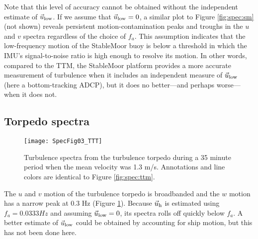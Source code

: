 Note that this level of accuracy cannot be obtained without the independent estimate of $\vec{u}_\mathrm{low}$. If we assume that $\vec{u}_\mathrm{low}=0$, a similar plot to Figure \ref{fig:spec:sm} (not shown) reveals persistent motion-contamination peaks and troughs in the $u$ and $v$ spectra regardless of the choice of $f_a$. This assumption indicates that the low-frequency motion of the StableMoor buoy is below a threshold in which the IMU's signal-to-noise ratio is high enough to resolve its motion. In other words, compared to the TTM, the StableMoor platform provides a more accurate measurement of turbulence when it includes an independent measure of $\vec{u}_\mathrm{low}$ (here a bottom-tracking ADCP), but it does no better---and perhaps worse---when it does not.
%
%


\subsection{Torpedo spectra}

\begin{figure}[t]
  \centering
  \texttt{[image: SpecFig03\_TTT]}
  \caption{Turbulence spectra from the turbulence torpedo during a 35 minute period when the mean velocity was 1.3 m/s. Annotations and line colors are identical to Figure \ref{fig:spec:ttm}.}
  \label{fig:spec:torpedo}
\end{figure}

The $u$ and $v$ motion of the turbulence torpedo is broadbanded and the $w$ motion has a narrow peak at 0.3 Hz (Figure \ref{fig:spec:torpedo}). Because $\vec{u}_\mathrm{h}$ is estimated using $f_a = 0.0333Hz$ and assuming $\vec{u}_\mathrm{low}=0$, its spectra rolls off quickly below $f_a$. A better estimate of $\vec{u}_\mathrm{low}$ could be obtained by accounting for ship motion, but this has not been done here.


